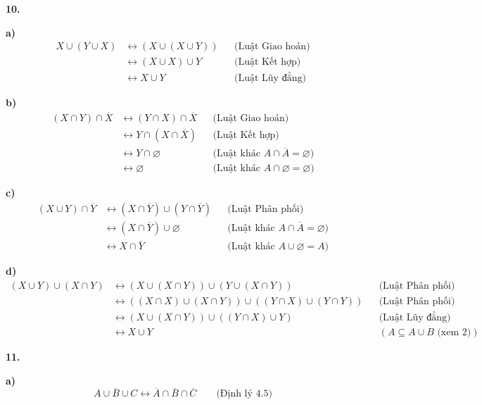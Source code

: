 \documentclass[12pt,a4paper]{article}
\theoremstyle{definition}
\begin{document}
\bigskip
\textbf{10.}

\textbf{a)}
\begin{align*}
X \cup (Y \cup X) &\leftrightarrow (X \cup (X \cup Y)) && \text{(Luật Giao hoán)}\\
&\leftrightarrow (X \cup X) \cup Y && \text{(Luật Kết hợp)}\\
&\leftrightarrow X \cup Y && \text{(Luật Lũy đẳng)}
\end{align*}

\textbf{b)}
\begin{align*}
(X \cap Y) \cap \overline{X} &\leftrightarrow (Y \cap X) \cap \overline{X} && \text{(Luật Giao hoán)}\\
&\leftrightarrow Y \cap (X \cap \overline{X}) && \text{(Luật Kết hợp)}\\
&\leftrightarrow Y \cap \varnothing && \text{(Luật khác $A \cap \overline{A} = \varnothing$)}\\
&\leftrightarrow \varnothing && \text{(Luật khác $A \cap \varnothing = \varnothing$)}
\end{align*}

\textbf{c)}
\begin{align*}
(X \cup Y) \cap \overline{Y} &\leftrightarrow (X \cap \overline{Y}) \cup (Y \cap \overline{Y}) && \text{(Luật Phân phối)}\\
&\leftrightarrow (X \cap \overline{Y}) \cup \varnothing && \text{(Luật khác $A \cap \overline{A} = \varnothing$)}\\
&\leftrightarrow X \cap \overline{Y} && \text{(Luật khác $A \cup \varnothing = A$)}
\end{align*}

\textbf{d)}
\begin{align*}
(X \cup Y) \cup (X \cap Y) &\leftrightarrow (X \cup (X \cap Y)) \cup (Y \cup (X \cap Y)) && \text{(Luật Phân phối)}\\
&\leftrightarrow ((X \cap X) \cup (X \cap Y)) \cup ((Y \cap X) \cup (Y \cap Y)) && \text{(Luật Phân phối)}\\
&\leftrightarrow (X \cup (X \cap Y)) \cup ((Y \cap X) \cup Y) && \text{(Luật Lũy đẳng)}\\
&\leftrightarrow X \cup Y && (A \subseteq A \cup B \text{ (xem 2)})
\end{align*}

\bigskip
\textbf{11.}

\textbf{a)}
\[\overline{A \cup B \cup C} \leftrightarrow \overline{A} \cap \overline{B} \cap \overline{C} \qquad \text{(Định lý 4.5)}\]
\end{document}
